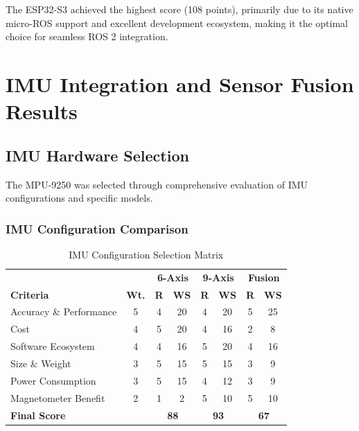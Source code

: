 The ESP32-S3 achieved the highest score (108 points), primarily due to its native micro-ROS support and excellent development ecosystem, making it the optimal choice for seamless ROS 2 integration.

\section{IMU Integration and Sensor Fusion Results}
\label{sec:imu_results}

\subsection{IMU Hardware Selection}

The MPU-9250 was selected through comprehensive evaluation of IMU configurations and specific models.

\subsubsection{IMU Configuration Comparison}

\begin{table}[H]
\centering
\caption{IMU Configuration Selection Matrix}
\label{tab:imu_config_selection}
\begin{tabular}{|l|c|c|c|c|c|c|c|}
\hline
 & & \multicolumn{2}{c|}{\textbf{6-Axis}} & \multicolumn{2}{c|}{\textbf{9-Axis}} & \multicolumn{2}{c|}{\textbf{Fusion}} \\
\textbf{Criteria} & \textbf{Wt.} & \textbf{R} & \textbf{WS} & \textbf{R} & \textbf{WS} & \textbf{R} & \textbf{WS} \\
\hline
Accuracy \& Performance & 5 & 4 & 20 & 4 & 20 & 5 & 25 \\
Cost & 4 & 5 & 20 & 4 & 16 & 2 & 8 \\
Software Ecosystem & 4 & 4 & 16 & 5 & 20 & 4 & 16 \\
Size \& Weight & 3 & 5 & 15 & 5 & 15 & 3 & 9 \\
Power Consumption & 3 & 5 & 15 & 4 & 12 & 3 & 9 \\
Magnetometer Benefit & 2 & 1 & 2 & 5 & 10 & 5 & 10 \\
\hline
\textbf{Final Score} & & \multicolumn{2}{c|}{\textbf{88}} & \multicolumn{2}{c|}{\textbf{93}} & \multicolumn{2}{c|}{\textbf{67}} \\
\hline
\end{tabular}
\end{table}

